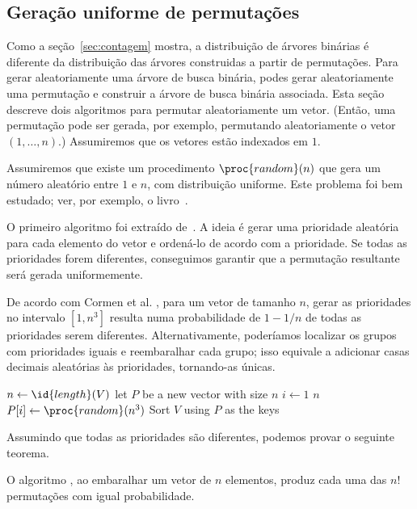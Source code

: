 \subsection{Geração uniforme de permutações}

Como a seção~\ref{sec:contagem} mostra,
a distribuição de árvores binárias é diferente
da distribuição das árvores construidas a partir de permutações.
Para gerar aleatoriamente uma árvore de busca binária,
podes gerar aleatoriamente uma permutação
e construir a árvore de busca binária associada.
Esta seção descreve dois algoritmos para permutar aleatoriamente um vetor.
(Então, uma permutação pode ser gerada, por exemplo,
permutando aleatoriamente o vetor $(1, \dots, n)$.)
Assumiremos que os vetores estão indexados em $1$.

Assumiremos que existe um procedimento $\proc{random}(n)$
que gera um número aleatório entre $1$ e $n$, com distribuição uniforme.
Este problema foi bem estudado; ver, por exemplo, o livro~\cite{Knuth1997}.

O primeiro algoritmo foi extraído de~\cite[p.125]{CormenLeisersonRivestStein2009}.
A ideia é gerar uma prioridade aleatória para cada elemento do vetor
e ordená-lo de acordo com a prioridade.
Se todas as prioridades forem diferentes,
conseguimos garantir que a permutação resultante será gerada uniformemente.

De acordo com Cormen et al. \cite[p.~125]{CormenLeisersonRivestStein2009},
para um vetor de tamanho $n$,
gerar as prioridades no intervalo $[1, n^3]$ resulta numa probabilidade de $1-1/n$
de todas as prioridades serem diferentes.
Alternativamente, poderíamos localizar os grupos com prioridades iguais
e reembaralhar cada grupo;
isso equivale a adicionar casas decimais aleatórias às prioridades,
tornando-as únicas.

\begin{codebox}
    \li $n \gets \id{length}(V)$
    \li let $P$ be a new vector with size $n$
    \li \For $i \gets 1$ \To $n$
    \li \Do
            $P[i] \gets \proc{random}(n^3)$
    \End
    \li Sort $V$ using $P$ as the keys
\end{codebox}

Assumindo que todas as prioridades são diferentes, podemos provar o seguinte teorema.

\begin{proposition}
    O algoritmo ,
    ao embaralhar um vetor de $n$ elementos,
    produz cada uma das $n!$ permutações
    com igual probabilidade.
\end{proposition}

